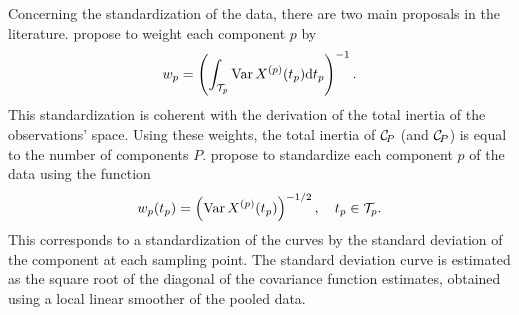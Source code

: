 Concerning the standardization of the data, there are two main proposals in the literature. \cite{happMultivariateFunctionalPrincipal2018a} propose to weight each component $p$ by
\begin{equation}
w_p = \left(\int_{\mathcal{T}_{p}} \operatorname{Var} X^{(p)}(t_p) {\rm d} t_p\right)^{-1}.
\end{equation}
This standardization is coherent with the derivation of the total inertia of the observations' space. Using these weights, the total inertia of $\mathcal{C}_{\!P}$ (and $\mathcal{C}_{\!P}$) is equal to the number of components $P$. \cite{chiouMultivariateFunctionalPrincipal2014} propose to standardize each component $p$ of the data using the function
\begin{equation}
w_p(t_p) = \left(\operatorname{Var} X^{(p)}(t_p)\right)^{-1/2}, \quad t_p \in \mathcal{T}_{p}.
\end{equation}
This corresponds to a standardization of the curves by the standard deviation of the component at each sampling point. The standard deviation curve is estimated as the square root of the diagonal of the covariance function estimates, obtained using a local linear smoother of the pooled data. 


